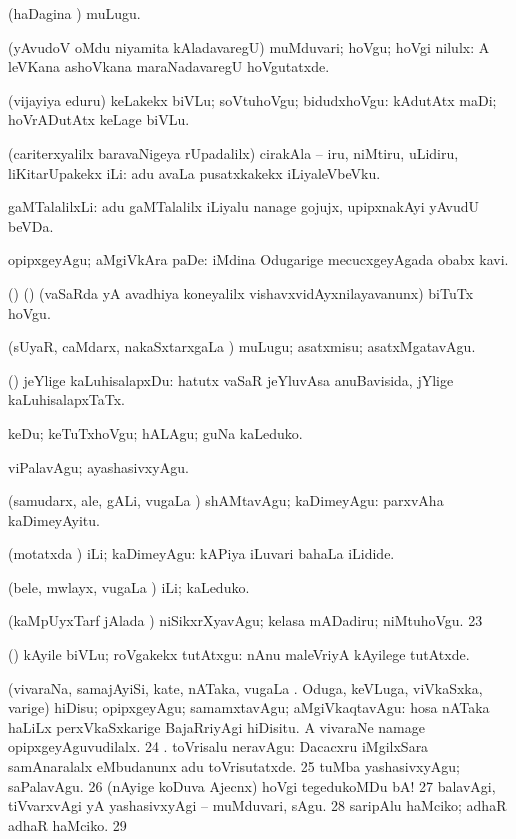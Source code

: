 {{ (haDagina \vi) muLugu. 

 (yAvudoV oMdu niyamita kAladavaregU)
muMduvari; hoVgu; hoVgi nilulx:  A leVKana ashoVkana maraNadavaregU hoVgutatxde. 

 (vijayiya eduru)
keLakekx biVLu; soVtuhoVgu; bidudxhoVgu:  kAdutAtx maDi;
hoVrADutAtx keLage biVLu. 

 (cariterxyalilx baravaNigeya rUpadalilx) cirakAla -- iru, niMtiru, uLidiru, liKitarUpakekx iLi: 
adu avaLa pusatxkakekx iLiyaleVbeVku. 

 gaMTalalilxLi:  adu gaMTalalilx iLiyalu nanage gojujx, upipxnakAyi yAvudU beVDa. 

 opipxgeyAgu; aMgiVkAra paDe:  iMdina Odugarige mecucxgeyAgada obabx kavi.

 (\birx) (\AmA) (vaSaRda yA avadhiya koneyalilx vishavxvidAyxnilayavanunx)
biTuTx hoVgu. 

 (sUyaR, caMdarx, nakaSxtarxgaLa \vi) muLugu; asatxmisu;
asatxMgatavAgu. 

 (\AmA) jeYlige kaLuhisalapxDu: 
hatutx vaSaR jeYluvAsa anuBavisida, jYlige kaLuhisalapxTaTx. 

 keDu; keTuTxhoVgu; hALAgu; guNa kaLeduko. 

 viPalavAgu; ayashasivxyAgu. 

 (samudarx,
ale, gALi, \mo vugaLa \vi) shAMtavAgu; kaDimeyAgu: 
parxvAha kaDimeyAyitu. 

 (motatxda \vi) iLi; kaDimeyAgu:  kAPiya iLuvari bahaLa iLidide. 

 (bele, mwlayx, \mo
vugaLa \vi) iLi; kaLeduko. 

 (kaMpUyxTarf jAlada \vi) niSikxrXyavAgu;
kelasa mADadiru; niMtuhoVgu. 
\num{23}  

 (\birx)
kAyile biVLu; roVgakekx tutAtxgu:  nAnu maleVriyA
kAyilege tutAtxde. 

 (vivaraNa, samajAyiSi, kate, nATaka, \mo vugaLa \vi.
Oduga,  keVLuga, viVkaSxka, \mo varige) hiDisu; opipxgeyAgu; samamxtavAgu;
aMgiVkaqtavAgu:  hosa nATaka haLiLx perxVkaSxkarige BajaRriyAgi hiDisitu.  A vivaraNe namage opipxgeyAguvudilalx.
\num{24} . toVrisalu neravAgu:  Dacacxru iMgilxSara samAnaralalx
eMbudanunx adu toVrisutatxde. 
\hypertarget{go pagu25}{}
\num{25}  tuMba yashasivxyAgu; saPalavAgu. 
\num{26}  (nAyige koDuva Ajecnx) hoVgi tegedukoMDu bA! 
\num{27}  balavAgi, tiVvarxvAgi yA yashasivxyAgi -- muMduvari, sAgu. 
\num{28}  saripAlu haMciko; adhaR adhaR haMciko. 
\num{29}  

}}
